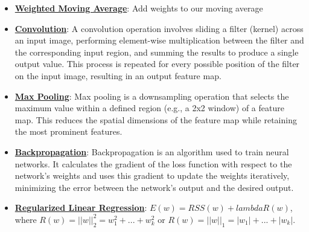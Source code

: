 \documentclass{article}%
\begin{document}
\begin{itemize}[leftmargin=*]
\item \href{https://purdue.brightspace.com/d2l/common/assets/pdfjs-d2l-dist/1.0.14-legacy/web/viewer.html?file=\%2Fcontent\%2Fenforced\%2F1095467-wl.202510.CS.24300.001\%2F07L2-Vision.pdf\%3Fou\%3D1095467\&lang=en-us\&container=d2l-fileviewer-rendered-pdf\&fullscreen=d2l-fileviewer-rendered-pdf-dialog\&height=667#page=40}{\textbf{Weighted Moving Average}}: Add weights to our moving average%
\item \href{https://purdue.brightspace.com/d2l/common/assets/pdfjs-d2l-dist/1.0.14-legacy/web/viewer.html?file=\%2Fcontent\%2Fenforced\%2F1095467-wl.202510.CS.24300.001\%2F09L1-cnn.pdf\%3Fou\%3D1095467\&lang=en-us\&container=d2l-fileviewer-rendered-pdf\&fullscreen=d2l-fileviewer-rendered-pdf-dialog\&height=667#page=6}{\textbf{Convolution}}: A convolution operation involves sliding a filter (kernel) across an input image, performing element-wise multiplication between the filter and the corresponding input region, and summing the results to produce a single output value. This process is repeated for every possible position of the filter on the input image, resulting in an output feature map.%
\item \href{https://purdue.brightspace.com/d2l/common/assets/pdfjs-d2l-dist/1.0.14-legacy/web/viewer.html?file=\%2Fcontent\%2Fenforced\%2F1095467-wl.202510.CS.24300.001\%2F09L1-cnn.pdf\%3Fou\%3D1095467\&lang=en-us\&container=d2l-fileviewer-rendered-pdf\&fullscreen=d2l-fileviewer-rendered-pdf-dialog\&height=667#page=14}{\textbf{Max Pooling}}: Max pooling is a downsampling operation that selects the maximum value within a defined region (e.g., a 2x2 window) of a feature map. This reduces the spatial dimensions of the feature map while retaining the most prominent features.%
\item \href{https://purdue.brightspace.com/d2l/common/assets/pdfjs-d2l-dist/1.0.14-legacy/web/viewer.html?file=\%2Fcontent\%2Fenforced\%2F1095467-wl.202510.CS.24300.001\%2F09L1-cnn.pdf\%3Fou\%3D1095467\&lang=en-us\&container=d2l-fileviewer-rendered-pdf\&fullscreen=d2l-fileviewer-rendered-pdf-dialog\&height=667#page=16}{\textbf{Backpropagation}}: Backpropagation is an algorithm used to train neural networks. It calculates the gradient of the loss function with respect to the network's weights and uses this gradient to update the weights iteratively, minimizing the error between the network's output and the desired output.%
\item \href{https://purdue.brightspace.com/d2l/common/assets/pdfjs-d2l-dist/1.0.14-legacy/web/viewer.html?file=\%2Fcontent\%2Fenforced\%2F1095467-wl.202510.CS.24300.001\%2F10L1-CrossValidation.pdf\%3Fou\%3D1095467\&lang=en-us\&container=d2l-fileviewer-rendered-pdf\&fullscreen=d2l-fileviewer-rendered-pdf-dialog\&height=667#page=17}{\textbf{Regularized Linear Regression}}: $E(w) = RSS(w) + lambda R(w)$, where $R(w) = ||w||_2^2 = w_1^2 + ... + w_k^2$ or $R(w) = ||w||_1 = |w_1| + ... + |w_k|$.%

\end{itemize}
\end{document}
